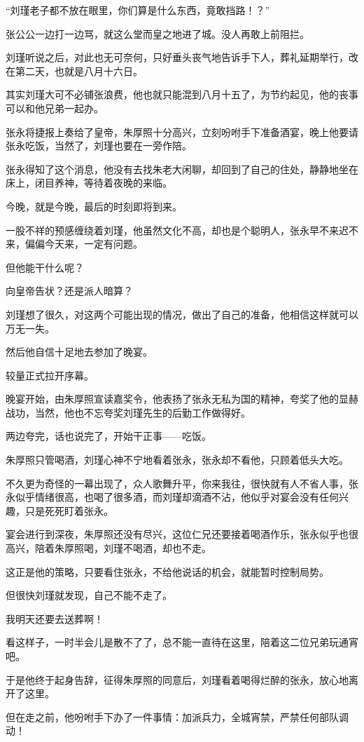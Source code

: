 \begin{multicols}{\theparacolNo}
“刘瑾老子都不放在眼里，你们算是什么东西，竟敢挡路！？”

张公公一边打一边骂，就这么堂而皇之地进了城。没人再敢上前阻拦。

刘瑾听说之后，对此也无可奈何，只好垂头丧气地告诉手下人，葬礼延期举行，改在第二天，也就是八月十六日。

其实刘瑾大可不必铺张浪费，他也就只能混到八月十五了，为节约起见，他的丧事可以和他兄弟一起办。

张永将捷报上奏给了皇帝，朱厚照十分高兴，立刻吩咐手下准备酒宴，晚上他要请张永吃饭，当然了，刘瑾也要在一旁作陪。

张永得知了这个消息，他没有去找朱老大闲聊，却回到了自己的住处，静静地坐在床上，闭目养神，等待着夜晚的来临。

今晚，就是今晚，最后的时刻即将到来。

一股不祥的预感缠绕着刘瑾，他虽然文化不高，却也是个聪明人，张永早不来迟不来，偏偏今天来，一定有问题。

但他能干什么呢？

向皇帝告状？还是派人暗算？

刘瑾想了很久，对这两个可能出现的情况，做出了自己的准备，他相信这样就可以万无一失。

然后他自信十足地去参加了晚宴。

较量正式拉开序幕。

晚宴开始，由朱厚照宣读嘉奖令，他表扬了张永无私为国的精神，夸奖了他的显赫战功，当然，他也不忘夸奖刘瑾先生的后勤工作做得好。

两边夸完，话也说完了，开始干正事——吃饭。

朱厚照只管喝酒，刘瑾心神不宁地看着张永，张永却不看他，只顾着低头大吃。

不久更为奇怪的一幕出现了，众人歌舞升平，你来我往，很快就有人不省人事，张永似乎情绪很高，也喝了很多酒，而刘瑾却滴酒不沾，他似乎对宴会没有任何兴趣，只是死死盯着张永。

宴会进行到深夜，朱厚照还没有尽兴，这位仁兄还要接着喝酒作乐，张永似乎也很高兴，陪着朱厚照喝，刘瑾不喝酒，却也不走。

这正是他的策略，只要看住张永，不给他说话的机会，就能暂时控制局势。

但很快刘瑾就发现，自己不能不走了。

我明天还要去送葬啊！

看这样子，一时半会儿是散不了了，总不能一直待在这里，陪着这二位兄弟玩通宵吧。

于是他终于起身告辞，征得朱厚照的同意后，刘瑾看着喝得烂醉的张永，放心地离开了这里。

但在走之前，他吩咐手下办了一件事情：加派兵力，全城宵禁，严禁任何部队调动！


\end{multicols}
